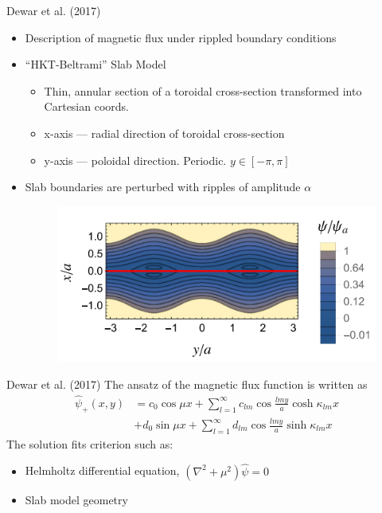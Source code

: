 \documentclass[compress]{beamer}
\begin{document}
\begin{frame}{Dewar et al. (2017) \cite{dewar2017}}
    \begin{itemize}
        \item Description of magnetic flux under rippled boundary conditions
        \item ``HKT-Beltrami'' Slab Model
            \begin{itemize}
                \item Thin, annular section of a toroidal cross-section transformed into Cartesian coords.
                \item x-axis --- radial direction of toroidal cross-section
                \item y-axis --- poloidal direction. Periodic. $y \in [-\pi,\pi]$
            \end{itemize}
        \item Slab boundaries are perturbed with ripples of amplitude $\alpha$

        \begin{figure}[htpb]
            \centering
            \includegraphics[scale=0.30]{media/dewar-boundary-ripples.png}
        \end{figure}
    \end{itemize}    
\end{frame}

\begin{frame}{Dewar et al. (2017) \cite{dewar2017}}
    The ansatz of the magnetic flux function is written as
    \begin{equation}
    \begin{split}
        \hat{\psi}_+ (x,y) & = c_0\cos{\mu x} + \sum_{l=1}^{\infty} c_{lm} \cos{\frac{lmy}{a}} \cosh{\kappa_{lm} x} \\
                           & + d_0 \sin{\mu x} + \sum_{l=1}^{\infty} d_{lm} \cos{\frac{lmy}{a}} \sinh{\kappa_{lm} x}
    \end{split} \end{equation} 
    The solution fits criterion such as:
    \begin{itemize}
        \item Helmholtz differential equation, $\left( \nabla^2 + \mu^2 \right) \hat{\psi}=0$
        \item Slab model geometry
    \end{itemize}
\end{frame}
\end{document}
